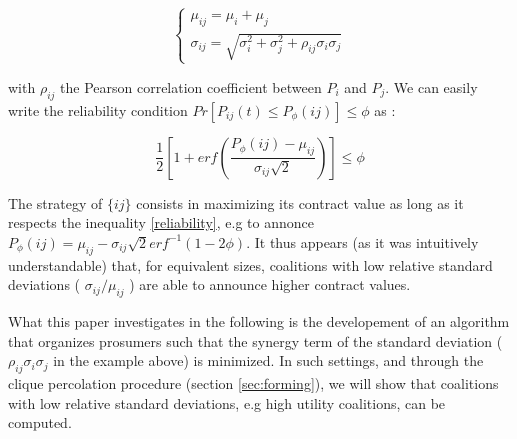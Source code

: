 \documentclass[conference]{IEEEtran}
\begin{document}
\begin{equation}
\left\{ \begin{array}{lll}
		\mu_{ij} = \mu_{i} + \mu_{j} \\
		\sigma_{ij} = \sqrt{\sigma_{i}^{2} + \sigma_{j}^{2} + \rho_{ij}\sigma_{i}\sigma_{j}}
\end{array} \right.
\label{parameters}
\end{equation}

with $ \rho_{ij} $ the Pearson correlation coefficient between $ P_{i} $ and $ P_{j} $. We can easily write the reliability condition $ Pr[P_{ij}(t) \leq P_{\phi}(ij) ] \leq \phi $ as :

\begin{equation}
\dfrac{1}{2} \left[ 1+ erf \left( \dfrac{P_{\phi}(ij) - \mu_{ij}}{\sigma_{ij}\sqrt{2}} \right) \right] \leq \phi
\label{reliability}
\end{equation}

The strategy of $ \{ij\} $ consists in maximizing its contract value as long as it respects the inequality \ref{reliability}, e.g to annonce $ P_{\phi}(ij) = \mu_{ij} - \sigma_{ij}\sqrt{2}erf^{-1}(1-2 \phi ) $. It thus appears (as it was intuitively understandable) that, for equivalent sizes, coalitions with low relative standard deviations ( $ \sigma_{ij} / \mu_{ij} $ ) are able to announce higher contract values. 

What this paper investigates in the following is the developement of an algorithm that organizes prosumers such that the synergy term of the standard deviation ( $ \rho_{ij}\sigma_{i}\sigma_{j} $ in the example above) is minimized. In such settings, and through the clique percolation procedure (section \ref{sec:forming}), we will show that coalitions with low relative standard deviations, e.g high utility coalitions, can be computed.
\end{document}
